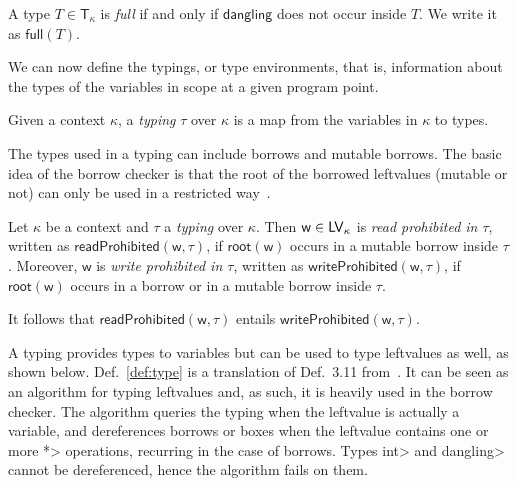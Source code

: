 \begin{definition}\label{def:full}
  A type $T\in\mathsf{T}_\kappa$ is \emph{full}
  if and only if $\mathsf{dangling}$ does not occur inside $T$.
  We write it as $\mathsf{full}(T)$.
\end{definition}
  
We can now define the typings, or type environments, that is,
information about the types of the variables in scope at a given program point.

\begin{definition}[Typing]\label{def:typing}
  Given a context $\kappa$, a \emph{typing} $\tau$ over $\kappa$ is
  a map from the variables in $\kappa$ to types.
\end{definition}

The types used in a typing can include borrows and mutable borrows.
The basic idea of the borrow checker is that the root of the
borrowed leftvalues (mutable or not) can only be used
in a restricted way~\cite{Pearce21}.

\begin{definition}\label{def:prohibited}
  Let $\kappa$ be a context and $\tau$ a \emph{typing} over $\kappa$.
  Then $\mathsf{w}\in\mathsf{LV}_\kappa$ is
  \emph{read prohibited in $\tau$},
  written as $\mathsf{readProhibited}(\mathsf{w},\tau)$,
  if $\mathsf{root}(\mathsf{w})$ occurs in a mutable borrow inside $\tau$.
  Moreover, $\mathsf{w}$ is \emph{write prohibited in $\tau$}, written
  as $\mathsf{writeProhibited}(\mathsf{w},\tau)$,
  if $\mathsf{root}(\mathsf{w})$ occurs in a borrow or in a
  mutable borrow inside $\tau$.
\end{definition}

\noindent
It follows that $\mathsf{readProhibited}(\mathsf{w},\tau)$ entails
$\mathsf{writeProhibited}(\mathsf{w},\tau)$.

A typing provides types to variables but can be used to type
leftvalues as well, as shown below. Def.~\ref{def:type} is a translation of
Def.~3.11 from~\cite{Pearce21}. It can be seen as an algorithm for typing leftvalues
and, as such, it is heavily used in the borrow checker.
The algorithm queries the typing when the leftvalue is actually a variable,
and dereferences borrows or boxes when the leftvalue contains one or more
\<*> operations, recurring in the case of borrows.
Types \<int> and \<dangling> cannot be dereferenced, hence the
algorithm fails on them.

